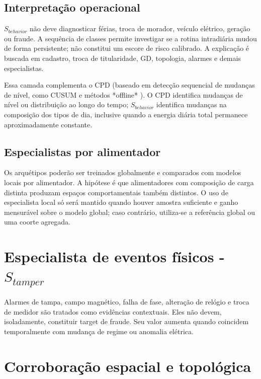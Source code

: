 \subsection{Interpretação operacional}\label{interpretauxe7uxe3o-operacional}

\(S_{behavior}\) não deve diagnosticar férias, troca de morador, veículo elétrico, geração ou fraude. A sequência de classes permite investigar se a rotina intradiária mudou de forma persistente; não constitui um escore de risco calibrado. A explicação é buscada em cadastro, troca de titularidade, GD, topologia, alarmes e demais especialistas.

Essa camada complementa o CPD (baseado em detecção sequencial de mudanças de nível, como CUSUM \autocite{page1954} e métodos *offline* \autocite{truong2020}). O CPD identifica mudanças de nível ou distribuição ao longo do tempo; \(S_{behavior}\) identifica mudanças na composição dos tipos de dia, inclusive quando a energia diária total permanece aproximadamente constante.

\subsection{Especialistas por alimentador}\label{especialistas-por-alimentador}

Os arquétipos poderão ser treinados globalmente e comparados com modelos locais por alimentador. A hipótese é que alimentadores com composição de carga distinta produzam espaços comportamentais também distintos. O uso de especialista local só será mantido quando houver amostra suficiente e ganho mensurável sobre o modelo global; caso contrário, utiliza-se a referência global ou uma coorte agregada.

\section{\texorpdfstring{Especialista de eventos físicos - \(S_{tamper}\)}{Especialista de eventos físicos - S\_\{tamper\}}}\label{especialista-de-eventos-fuxedsicos---s_tamper}

Alarmes de tampa, campo magnético, falha de fase, alteração de relógio e troca de medidor são tratados como evidências contextuais. Eles não devem, isoladamente, constituir target de fraude. Seu valor aumenta quando coincidem temporalmente com mudança de regime ou anomalia elétrica.

\section{Corroboração espacial e topológica}\label{corroborauxe7uxe3o-espacial-e-topoluxf3gica}

